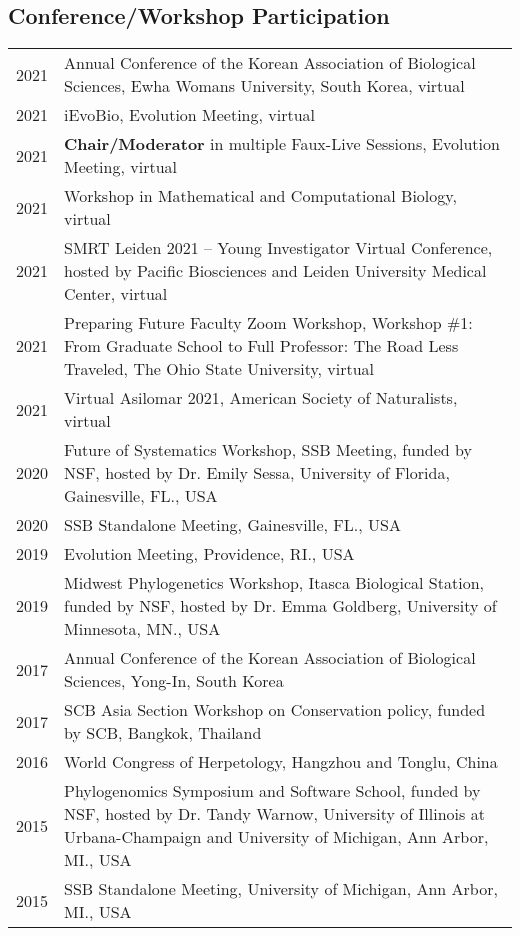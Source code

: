 \documentclass[11pt]{article}
\begin{document}
\subsection*{Conference/Workshop Participation}
\begin{longtable}{p{}  p{}}
2021 & Annual Conference of the Korean Association of Biological Sciences, Ewha Womans University, South Korea, virtual\\
2021 & iEvoBio, Evolution Meeting, virtual\\
2021 & \textbf{Chair/Moderator} in multiple Faux-Live Sessions, Evolution Meeting, virtual\\

2021 & Workshop in Mathematical and Computational Biology, virtual\\
2021 & SMRT Leiden 2021 – Young Investigator Virtual Conference, hosted by Pacific Biosciences and Leiden University Medical Center, virtual\\
2021 & Preparing Future Faculty Zoom Workshop, Workshop \#1: From Graduate School to Full Professor: The Road Less Traveled, The Ohio State University, virtual\\
2021 & Virtual Asilomar 2021, American Society of Naturalists, virtual\\
2020 & Future of Systematics Workshop, SSB Meeting, funded by NSF, hosted by Dr. Emily Sessa, University of Florida, Gainesville, FL., USA\\
2020 & SSB Standalone Meeting, Gainesville, FL., USA\\
2019 & Evolution Meeting, Providence, RI., USA\\
2019 & Midwest Phylogenetics Workshop, Itasca Biological Station, funded by NSF, hosted by Dr. Emma Goldberg, University of Minnesota, MN., USA\\
2017 & Annual Conference of the Korean Association of Biological Sciences, Yong-In, South Korea\\
2017 & SCB Asia Section Workshop on Conservation policy, funded by SCB, Bangkok, Thailand\\
2016 & World Congress of Herpetology, Hangzhou and Tonglu, China\\
2015 & Phylogenomics Symposium and Software School, funded by NSF, hosted by Dr. Tandy Warnow, University of Illinois at Urbana-Champaign and University of Michigan, Ann Arbor, MI., USA\\
2015 & SSB Standalone Meeting, University of Michigan, Ann Arbor, MI., USA\vspace{5pt}\\
\end{longtable}
\end{document}
